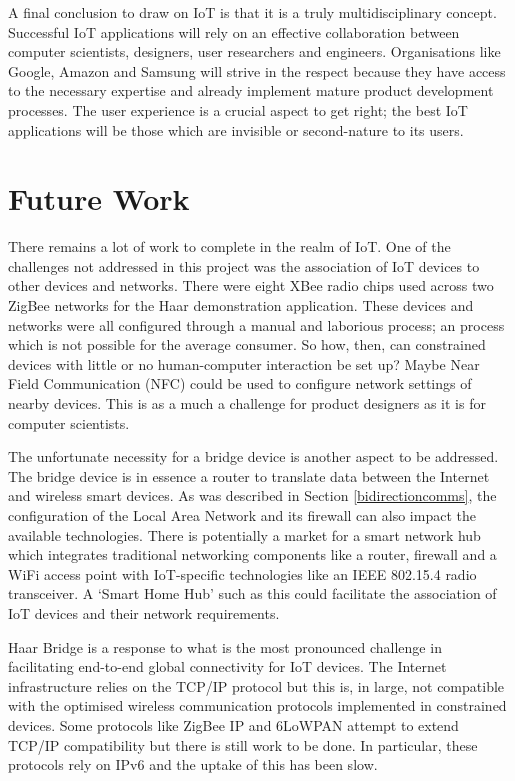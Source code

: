     A final conclusion to draw on IoT is that it is a truly multidisciplinary concept. Successful IoT applications will rely on an effective collaboration between computer scientists, designers, user researchers and engineers. Organisations like Google, Amazon and Samsung will strive in the respect because they have access to the necessary expertise and already implement mature product development processes. The user experience is a crucial aspect to get right; the best IoT applications will be those which are invisible or second-nature to its users.

  \section{Future Work}
    There remains a lot of work to complete in the realm of IoT. One of the challenges not addressed in this project was the association of IoT devices to other devices and networks. There were eight XBee radio chips used across two ZigBee networks for the Haar demonstration application. These devices and networks were all configured through a manual and laborious process; an process which is not possible for the average consumer. So how, then, can constrained devices with little or no human-computer interaction be set up? Maybe Near Field Communication (NFC) could be used to configure network settings of nearby devices. This is as a much a challenge for product designers as it is for computer scientists.

    The unfortunate necessity for a bridge device is another aspect to be addressed. The bridge device is in essence a router to translate data between the Internet and wireless smart devices. As was described in Section \ref{bidirectioncomms}, the configuration of the Local Area Network and its firewall can also impact the available technologies. There is potentially a market for a smart network hub which integrates traditional networking components like a router, firewall and a WiFi access point with IoT-specific technologies like an IEEE 802.15.4 radio transceiver. A `Smart Home Hub' such as this could facilitate the association of IoT devices and their network requirements.

    Haar Bridge is a response to what is the most pronounced challenge in facilitating end-to-end global connectivity for IoT devices. The Internet infrastructure relies on the TCP/IP protocol but this is, in large, not compatible with the optimised wireless communication protocols implemented in constrained devices. Some protocols like ZigBee IP and 6LoWPAN attempt to extend TCP/IP compatibility but there is still work to be done. In particular, these protocols rely on IPv6 and the uptake of this has been slow.

